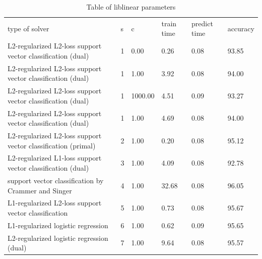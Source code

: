 \documentclass[12pt,oneside]{book}
\begin{document}
\begin{table}
\begin{tabular}{|l|l|l|l|l|l|}
\hline

type of solver                                                    & s               &c               & train time      & predict time    & accuracy        \\
L2-regularized L2-loss support vector classification (dual)       & 1               & 0.00            & 0.26            & 0.08            & 93.85           \\
L2-regularized L2-loss support vector classification (dual)       & 1               & 1.00            & 3.92            & 0.08            & 94.00           \\
L2-regularized L2-loss support vector classification (dual)       & 1               & 1000.00         & 4.51            & 0.09            & 93.27           \\
L2-regularized L2-loss support vector classification (dual)       & 1               & 1.00            & 4.69            & 0.08            & 94.00           \\
L2-regularized L2-loss support vector classification (primal)     & 2               & 1.00            & 0.20            & 0.08            & 95.12           \\
L2-regularized L1-loss support vector classification (dual)       & 3               & 1.00            & 4.09            & 0.08            & 92.78           \\
support vector classification by Crammer and Singer               & 4               & 1.00            & 32.68           & 0.08            & 96.05           \\
L1-regularized L2-loss support vector classification              & 5               & 1.00            & 0.73            & 0.08            & 95.67           \\
L1-regularized logistic regression                                & 6               & 1.00            & 0.62            & 0.09            & 95.65           \\
L2-regularized logistic regression (dual)                         & 7               & 1.00            & 9.64            & 0.08            & 95.57           \\



\hline
\end{tabular}
\caption{Table of liblinear parameters}
\label{table:obv-3-liblinearParams}
\end{table}
\end{document}
